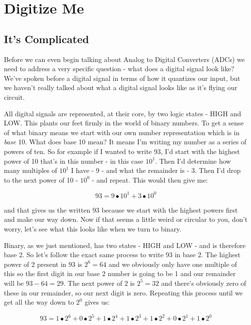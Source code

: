 \documentclass[12pt,a6paper]{book}
\begin{document}
\chapter{Digitize Me}
\section{It's Complicated}
Before we can even begin talking about Analog to Digital Converters (ADCs) we need to address a very specific question - what does a digital signal look like? We've spoken before a digital signal in terms of how it quantizes our input, but we haven't really talked about what a digital signal looks like as it's flying our circuit. 

All digital signals are represented, at their core, by two logic states - HIGH and LOW. This plants our feet firmly in the world of binary numbers. To get a sense of what binary means we start with our own number representation which is in \textit{base} 10. What does base 10 mean? It means I'm writing my number as a series of powers of ten. So for example if I wanted to write 93, I'd start with the highest power of 10 that's in this number - in this case $10^1$. Then I'd determine how many multiples of $10^1$ I have - 9 - and what the remainder is - 3. Then I'd drop to the next power of 10 - $10^0$ - and repeat. This would then give me:

\begin{equation}
93 = 9 \bullet 10^1 + 3 \bullet 10^0
\end{equation}

and that gives us the written 93 because we start with the highest powers first and make our way down. Now if that seems a little weird or circular to you, don't worry, let's see what this looks like when we turn to binary. 

Binary, as we just mentioned, has two states - HIGH and LOW - and is therefore base 2. So let's follow the exact same process to write 93 in base 2. The highest power of 2 present in 93 is $2^6=64$ and we obviously only have one multiple of this so the first digit in our base 2 number is going to be 1 and our remainder will be $93 - 64=29$. The next power of 2 is $2^5=32$ and there's obviously zero of these in our remainder, so our next digit is zero. Repeating this process until we get all the way down to $2^0$ gives us:

\begin{equation}
93 = 1 \bullet 2^6 + 0 \bullet 2^5 + 1 \bullet 2 ^ 4 + 1 \bullet 2 ^ 3 + 1 \bullet 2 ^ 2 + 0 \bullet 2 ^ 1 + 1 \bullet 2 ^ 0
\end{equation}
\end{document}
